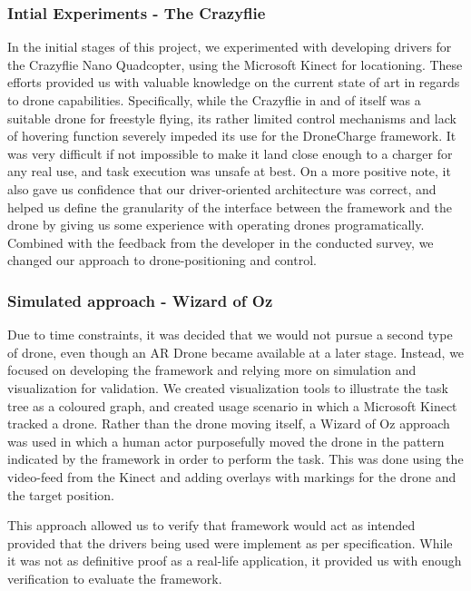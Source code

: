 \subsubsection{Intial Experiments - The Crazyflie}
In the initial stages of this project, we experimented with developing drivers for the Crazyflie Nano Quadcopter, using the Microsoft Kinect for locationing. These efforts provided us with valuable knowledge on the current state of art in regards to drone capabilities. Specifically, while the Crazyflie in and of itself was a suitable drone for freestyle flying, its rather limited control mechanisms and lack of hovering function severely impeded its use for the DroneCharge framework. It was very difficult if not impossible to make it land close enough to a charger for any real use, and task execution was unsafe at best. On a more positive note, it also gave us confidence that our driver-oriented architecture was correct, and helped us define the granularity of the interface between the framework and the drone by giving us some experience with operating drones programatically. Combined with the feedback from the developer in the conducted survey, we changed our approach to drone-positioning and control.

\subsubsection{Simulated approach - Wizard of Oz}
Due to time constraints, it was decided that we would not pursue a second type of drone, even though an AR Drone became available at a later stage. Instead, we focused on developing the framework and relying more on simulation and visualization for validation. We created visualization tools to illustrate the task tree as a coloured graph, and created usage scenario in which a Microsoft Kinect tracked a drone. Rather than the drone moving itself, a Wizard of Oz approach was used in which a human actor purposefully moved the drone in the pattern indicated by the framework in order to perform the task. This was done using the video-feed from the Kinect and adding overlays with markings for the drone and the target position.


This approach allowed us to verify that framework would act as intended provided that the drivers being used were implement as per specification.  While it was not as definitive proof as a real-life application, it provided us with enough verification to evaluate the framework.

